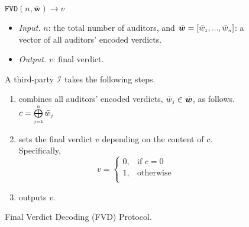  \vspace{-2mm}
\begin{figure}[!htbp]
\setlength{\fboxsep}{1pt}
\begin{center}
    \begin{tcolorbox}[enhanced,width=81mm, height=55.5mm, left=0mm,
    drop fuzzy shadow southwest,
    colframe=black,colback=white]
   { \small{
    \vspace{-1.3mm}
\underline{$\mathtt{FVD}(n,  \bar{\bm w})\rightarrow  v$}\\
%
\vspace{-2.1mm}
\begin{itemize}[leftmargin=4.2mm]
\item \noindent\textit{Input.} $n$:  the total number of  auditors,  and  $\bar{\bm w}=[\bar{ w}_{\scriptscriptstyle 1},..., \bar{ w}_{\scriptscriptstyle n}]$:  a vector of all auditors' encoded  verdicts.
%
\item \noindent\textit{Output.} $v$: final verdict.  
%
\end{itemize}
A third-party $\mathcal{I}$ takes the following steps.
    \vspace{-1.3mm}
\begin{enumerate}[leftmargin=5mm]
%
\item combines  all auditors' encoded verdicts, $\bar w_{\scriptscriptstyle j}\in \bar{\bm {w}}$, as follows. 
%
$c= \bigoplus\limits^{\scriptscriptstyle n}_{\scriptscriptstyle j=1} \bar w_{\scriptscriptstyle j}$
%
\item sets the final verdict $v$ depending on the content of $c$. Specifically, 
%
\vspace{-1mm}
\begin{equation*}
   v= 
\begin{cases}
    0,              &\text{if } c= 0\\
   1 ,& \text{otherwise }\\
\end{cases}
\end{equation*}
%
\item outputs  $v$. 
\vspace{-1.5mm}
 \end{enumerate}
}}
\end{tcolorbox}
\end{center}
\vspace{-3mm}
\caption{Final Verdict Decoding  (FVD) Protocol.} 
\label{fig:FVD}
\end{figure}


